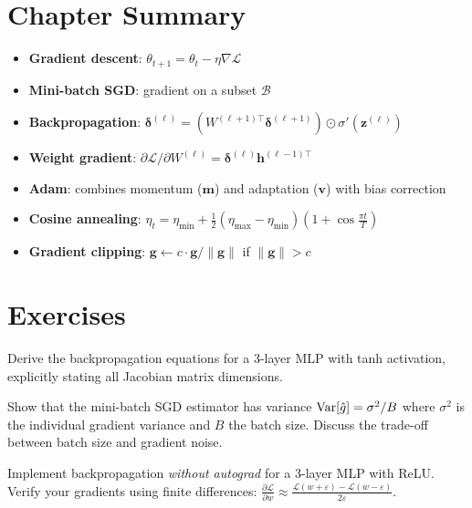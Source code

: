 \section{Chapter Summary}

\begin{keyformulas}
\begin{itemize}
\item \textbf{Gradient descent}: $\theta_{t+1} = \theta_t - \eta \nabla \mathcal{L}$
\item \textbf{Mini-batch SGD}: gradient on a subset $\mathcal{B}$
\item \textbf{Backpropagation}: $\bm{\delta}^{(\ell)} = (W^{(\ell+1)\top}\bm{\delta}^{(\ell+1)}) \odot \sigma'(\bm{z}^{(\ell)})$
\item \textbf{Weight gradient}: $\partial\mathcal{L}/\partial W^{(\ell)} = \bm{\delta}^{(\ell)} \bm{h}^{(\ell-1)\top}$
\item \textbf{Adam}: combines momentum ($\bm{m}$) and adaptation ($\bm{v}$) with bias correction
\item \textbf{Cosine annealing}: $\eta_t = \eta_{\min} + \frac{1}{2}(\eta_{\max}-\eta_{\min})(1+\cos\frac{\pi t}{T})$
\item \textbf{Gradient clipping}: $\bm{g} \leftarrow c \cdot \bm{g}/\|\bm{g}\|$ if $\|\bm{g}\| > c$
\end{itemize}
\end{keyformulas}

\section{Exercises}

\begin{exercise}
Derive the backpropagation equations for a 3-layer MLP with tanh activation, explicitly stating all Jacobian matrix dimensions.
\end{exercise}

\begin{exercise}
Show that the mini-batch SGD estimator has variance $\mathrm{Var}[\hat{g}] = \sigma^2/B$ where $\sigma^2$ is the individual gradient variance and $B$ the batch size. Discuss the trade-off between batch size and gradient noise.
\end{exercise}

\begin{exercise}
Implement backpropagation \emph{without autograd} for a 3-layer MLP with ReLU. Verify your gradients using finite differences: $\frac{\partial \mathcal{L}}{\partial w} \approx \frac{\mathcal{L}(w+\varepsilon) - \mathcal{L}(w-\varepsilon)}{2\varepsilon}$.
\end{exercise}

